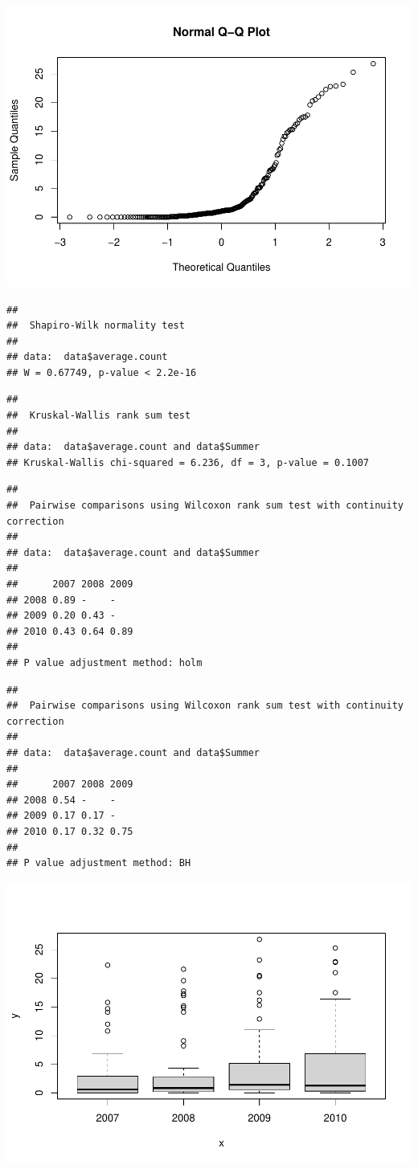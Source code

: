 \documentclass[
]{article}
\begin{document}
\includegraphics{Statistical-analysis-in-RStudio_files/figure-latex/unnamed-chunk-5-1.pdf}

\begin{verbatim}
## 
##  Shapiro-Wilk normality test
## 
## data:  data$average.count
## W = 0.67749, p-value < 2.2e-16
\end{verbatim}

\begin{verbatim}
## 
##  Kruskal-Wallis rank sum test
## 
## data:  data$average.count and data$Summer
## Kruskal-Wallis chi-squared = 6.236, df = 3, p-value = 0.1007
\end{verbatim}

\begin{verbatim}
## 
##  Pairwise comparisons using Wilcoxon rank sum test with continuity correction 
## 
## data:  data$average.count and data$Summer 
## 
##      2007 2008 2009
## 2008 0.89 -    -   
## 2009 0.20 0.43 -   
## 2010 0.43 0.64 0.89
## 
## P value adjustment method: holm
\end{verbatim}

\begin{verbatim}
## 
##  Pairwise comparisons using Wilcoxon rank sum test with continuity correction 
## 
## data:  data$average.count and data$Summer 
## 
##      2007 2008 2009
## 2008 0.54 -    -   
## 2009 0.17 0.17 -   
## 2010 0.17 0.32 0.75
## 
## P value adjustment method: BH
\end{verbatim}

\includegraphics{Statistical-analysis-in-RStudio_files/figure-latex/unnamed-chunk-10-1.pdf}
\end{document}
